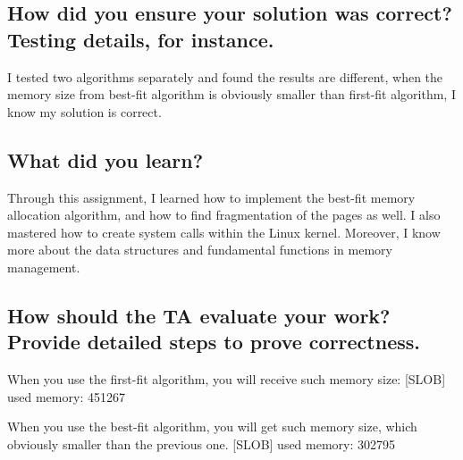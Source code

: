 \documentclass[10pt,draftclsnofoot,peerreview,letterpaper,onecolumn,]{IEEEtran}
\begin{document}
\subsection{How did you ensure your solution was correct? Testing details, for instance.}
I tested two algorithms separately and found the results are different, when the memory size from best-fit algorithm is obviously smaller than first-fit algorithm, I know my solution is correct.

\subsection{What did you learn?}
Through this assignment, I learned how to implement the best-fit memory allocation algorithm, and how to find fragmentation of the pages as well. I also mastered how to create system calls within the Linux kernel. Moreover, I know more about the data structures and fundamental functions in memory management.

\subsection{How should the TA evaluate your work? Provide detailed steps to prove correctness.}
When you use the first-fit algorithm, you will receive such memory size:
[SLOB]
used memory: 451267

When you  use the best-fit algorithm, you will get such memory size, which obviously smaller than the previous one.
[SLOB]
used memory: 302795
\end{document}
